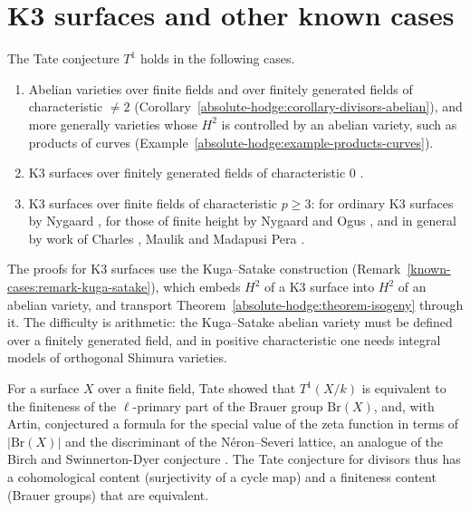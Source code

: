 \section{K3 surfaces and other known cases}\label{absolute-hodge:section-known}

\begin{theorem}\label{absolute-hodge:theorem-known}
The Tate conjecture $T^1$ holds in the following cases.
\begin{enumerate}
\item Abelian varieties over finite fields and over finitely generated fields of characteristic $\neq 2$ (Corollary~\ref{absolute-hodge:corollary-divisors-abelian}), and more generally varieties whose
$H^2$ is controlled by an abelian variety, such as products of curves (Example~\ref{absolute-hodge:example-products-curves}).
\item K3 surfaces over finitely generated fields of characteristic $0$ \cite{andre-1996}.
\item K3 surfaces over finite fields of characteristic $p \geq 3$: for ordinary K3 surfaces by Nygaard \cite{nygaard-1983}, for those of finite height by Nygaard and Ogus \cite{nygaard-ogus-1985}, and in
general by work of Charles \cite{charles-2013}, Maulik \cite{maulik-2014} and Madapusi Pera \cite{madapusi-pera-2015}.
\end{enumerate}
\end{theorem}

The proofs for K3 surfaces use the Kuga--Satake construction (Remark~\ref{known-cases:remark-kuga-satake}), which embeds $H^2$ of a K3 surface into $H^2$ of an abelian variety, and transport
Theorem~\ref{absolute-hodge:theorem-isogeny} through it. The difficulty is arithmetic: the Kuga--Satake abelian variety must be defined over a finitely generated field, and in positive characteristic one needs
integral models of orthogonal Shimura varieties.

\begin{remark}\label{absolute-hodge:remark-artin-tate}
For a surface $X$ over a finite field, Tate showed that $T^1(X/k)$ is equivalent to the finiteness of the $\ell$-primary part of the Brauer group $\mathrm{Br}(X)$, and, with Artin, conjectured a formula
for the special value of the zeta function in terms of $|\mathrm{Br}(X)|$ and the discriminant of the N\'eron--Severi lattice, an analogue of the Birch and Swinnerton-Dyer conjecture
\cite{tate-bourbaki-1966}. The Tate conjecture for divisors thus has a cohomological content (surjectivity of a cycle map) and a finiteness content (Brauer groups) that are equivalent.
\end{remark}

